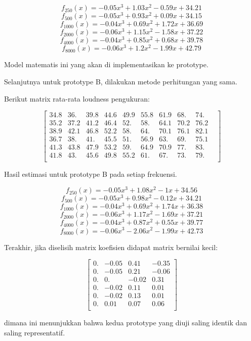 \documentclass[12pt,]{article}
\begin{document}
\begin{itemize}
		\[f_{250}(x) = -0.05x^3 + 1.03x^2 - 0.59x + 34.21\]
		\[f_{500}(x) = -0.05x^3 + 0.93x^2 + 0.09x + 34.15\]
		\[f_{1000}(x) = -0.04x^3 + 0.69x^2 + 1.72x + 36.69\]
		\[f_{2000}(x) = -0.06x^3 + 1.15x^2 - 1.58x + 37.22\]
		\[f_{4000}(x) = -0.04x^3 + 0.85x^2 + 0.68x + 39.78\]
		\[f_{8000}(x) = -0.06x^3 + 1.2x^2 - 1.99x + 42.79\]

		Model matematis ini yang akan di implementasikan ke prototype.

		\newpage
		Selanjutnya untuk prototype B, dilakukan metode perhitungan yang sama.

		Berikut matrix rata-rata loudness pengukuran:

		\[\left[
		\begin{matrix}
			34.8&36.&39.8&44.6&49.9&55.8&61.9&68.&74.&\\
			35.2&37.2&41.2&46.4&52.&58.&64.1&70.2&76.2\\
			38.9&42.1&46.8&52.2&58.&64.&70.1&76.1&82.1\\
			36.7&38.&41.&45.5&51.&56.9&63.&69.&75.1\\
			41.3&43.8&47.9&53.2&59.&64.9&70.9&77.&83.&\\
			41.8&43.&45.6&49.8&55.2&61.&67.&73.&79.&\\
		\end{matrix}
		\right]\]

		Hasil estimasi untuk prototype B pada setiap frekuensi.

		\[f_{250}(x) = -0.05x^3 + 1.08x^2 - 1x + 34.56\]
		\[f_{500}(x) = -0.05x^3 + 0.98x^2 - 0.12x + 34.21\]
		\[f_{1000}(x) = -0.04x^3 + 0.69x^2 + 1.74x + 36.38\]
		\[f_{2000}(x) = -0.06x^3 + 1.17x^2 - 1.69x + 37.21\]
		\[f_{4000}(x) = -0.04x^3 + 0.87x^2 + 0.55x + 39.77\]
		\[f_{8000}(x) = -0.06x^3 - 2.06x^2 - 1.99x + 42.73\]

		Terakhir, jika diselisih matrix koefisien didapat matrix bernilai kecil:

		\[\left[
		\begin{matrix}
			0.  & -0.05 &  0.41 & -0.35\\
			0.  & -0.05 &  0.21 & -0.06\\
			0.  &  0.   & -0.02 &  0.31\\
			0.  & -0.02 &  0.11 &  0.01\\
			0.  & -0.02 &  0.13 &  0.01\\
			0.  &  0.01 &  0.07 &  0.06\\
		\end{matrix}
		\right]\]

		dimana ini menunjukkan bahwa kedua prototype yang diuji saling identik dan saling representatif.
	\end{itemize}
\end{document}
